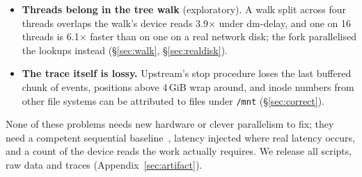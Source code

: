 \begin{itemize}
  largest gain we saw for the fork's own lookups was 1.4--1.6$\times$, on F2FS
  (\S\ref{sec:fiemap}).
\item \textbf{Threads belong in the tree walk} (exploratory). A walk split across four
  threads overlaps the walk's device reads 3.9$\times$ under dm-delay, and one on 16
  threads is 6.1$\times$ faster than on one on a real network disk; the fork
  parallelised the lookups instead (\S\ref{sec:walk}, \S\ref{sec:realdisk}).
\item \textbf{The trace itself is lossy.} Upstream's stop procedure loses the last
  buffered chunk of events, positions above 4\,GiB wrap around, and inode numbers
  from other file systems can be attributed to files under \texttt{/mnt}
  (\S\ref{sec:correct}).
\end{itemize}

None of these problems needs new hardware or clever parallelism to fix; they need a
competent sequential baseline~\cite{mcsherry2015cost}, latency injected where real
latency occurs, and a count of the device reads the work actually requires. We
release all scripts, raw data and traces (Appendix~\ref{sec:artifact}).
